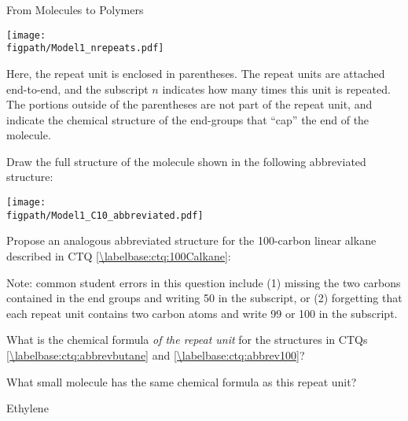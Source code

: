 \begin{activity}{From Molecules to Polymers}
\begin{infobox}
	\centerline{\texttt{[image: \\figpath/Model1\_nrepeats.pdf]}}
	
	Here, the repeat unit is enclosed in parentheses.  The repeat units are attached end-to-end, and the subscript $n$ indicates how many times this unit is repeated.  The portions outside of the parentheses are not part of the repeat unit, and indicate the chemical structure of the end-groups that ``cap'' the end of the molecule.
\end{infobox}

\begin{ctqs}
	\question Draw the full structure of the molecule shown in the following abbreviated structure: \label{\labelbase:ctq:abbrevbutane}
	
		\vspace{6pt}
		\centerline{\texttt{[image: \\figpath/Model1\_C10\_abbreviated.pdf]}}
		
		\begin{solution}[1.25in]
		\end{solution}
	
	\question Propose an analogous abbreviated structure for the 100-carbon linear alkane described in CTQ \ref{\labelbase:ctq:100Calkane}: \label{\labelbase:ctq:abbrev100}
		
		\begin{solution}[0.75in]
			Note: common student errors in this question include (1) missing the two carbons contained in the end groups and writing 50 in the subscript, or (2) forgetting that each repeat unit contains two carbon atoms and write 99 or 100 in the subscript.
		\end{solution}
	
	\question What is the chemical formula \emph{of the repeat unit} for the structures in CTQs \ref{\labelbase:ctq:abbrevbutane} and \ref{\labelbase:ctq:abbrev100}?
		
		\begin{solution}[0.75in]
		\end{solution}
	
	\question What small molecule has the same chemical formula as this repeat unit?
		
		\begin{solution}[0.75in]
			Ethylene
			

\end{solution}
\end{ctqs}
\end{activity}
